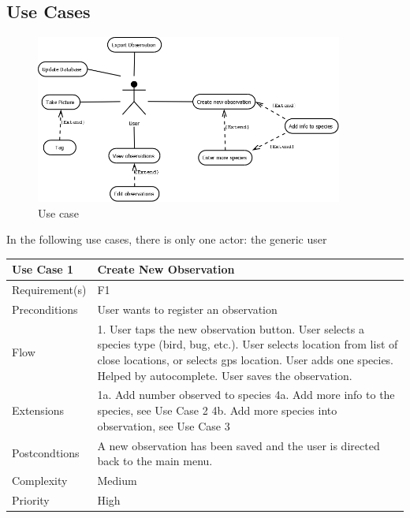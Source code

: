 \subsection{Use Cases}
\begin{figure}[htb]
	\centering
	\includegraphics[width=0.9\textwidth]{reqspec/UseCase.png}
	\caption{Use case}
	\label{fig:usecase}
\end{figure}

In the following use cases, there is only one actor: the generic user

\begin{tabular}[t]{|l|p{}|}\hline
	Use Case 1&Create New Observation\\\hline
	Requirement(s)&F1\\\hline
	Preconditions&User wants to register an observation\\\hline
	Flow&1. User taps the new observation button\newline
	2. User selects a species type (bird, bug, etc.)\newline
	3. User selects location from list of close locations, or selects gps location\newline
	4. User adds one species. Helped by autocomplete\newline
	5. User saves the observation.\\\hline
	Extensions& 1a. Add number observed to species\newline
	4a. Add more info to the species, see Use Case 2\newline
	4b. Add more species into observation, see Use Case 3\\\hline
	Postcondtions&A new observation has been saved and the user is directed back to the main menu.\\\hline
	Complexity&Medium\\\hline
	Priority&High\\\hline
\end{tabular}

